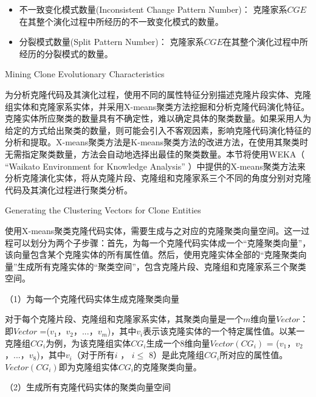 \begin{itemize}
\item
不一致变化模式数量(Inconsistent Change Pattern Number)：
克隆家系{$CGE$}在其整个演化过程中所经历的不一致变化模式的数量。
\item
分裂模式数量(Split Pattern Number)：
克隆家系{$CGE$}在其整个演化过程中所经历的分裂模式的数量。
\end{itemize}

{Mining Clone Evolutionary Characteristics}

为分析克隆代码及其演化过程，使用不同的属性特征分别描述克隆片段实体、克隆组实体和克隆家系实体，并采用X-means\cite{pelleg2000x}聚类方法挖掘和分析克隆代码演化特征。克隆实体所应聚类的数量具有不确定性，难以确定具体的聚类数量。如果采用人为给定的方式给出聚类的数量，则可能会引入不客观因素，影响克隆代码演化特征的分析和提取。X-means聚类方法是K-means聚类方法的改进方法，在使用其聚类时无需指定聚类数量，方法会自动地选择出最佳的聚类数量。本节将使用WEKA（ “Waikato Environment for Knowledge Analysis” \cite{hall2009weka}）中提供的X-means聚类方法来分析克隆演化实体，将从克隆片段、克隆组和克隆家系三个不同的角度分别对克隆代码及其演化过程进行聚类分析。

{Generating the Clustering Vectors for Clone Entities}

使用X-means聚类克隆代码实体，需要生成与之对应的克隆聚类向量空间。这一过程可以划分为两个子步骤：首先，为每一个克隆代码实体成一个“克隆聚类向量”，该向量包含某个克隆实体的所有属性值。然后，使用克隆实体全部的“克隆聚类向量”生成所有克隆实体的“聚类空间”，包含克隆片段、克隆组和克隆家系三个聚类空间。

（1）为每一个克隆代码实体生成克隆聚类向量

对于每个克隆片段、克隆组和克隆家系实体，其聚类向量是一个$m$维向量$Vector$：即{$Vector$ ={($v_1$，$v_2$，$...$，$v_m$)}}，其中$v_i$表示该克隆实体的一个特定属性值。以某一克隆组{$CG_i$}为例，为该克隆组实体{$CG_i$}生成一个8维向量{$Vector(CG_i)$ = ($v_1$，$v_2$，$...$，$v_8$)}，其中$v_i$（对于所有$i$ ， $i \leq $ 8）是此克隆组{$CG_i$}所对应的属性值。$Vector(CG_i)$即为克隆组实体{$CG_i$}的克隆聚类向量。
 
（2）生成所有克隆代码实体的聚类向量空间


